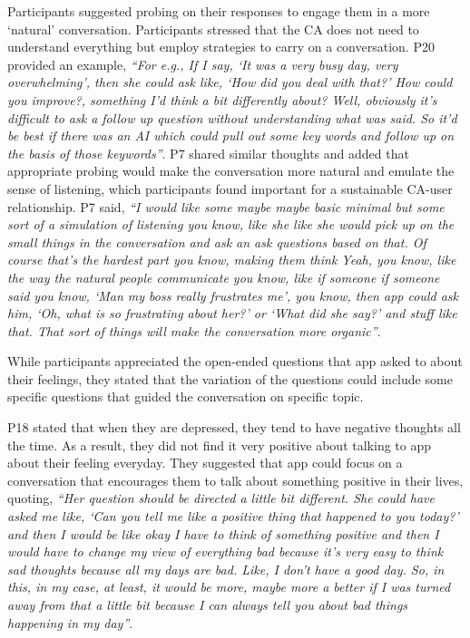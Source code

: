                 Participants suggested probing on their responses to engage them in a more `natural' conversation. Participants stressed that the \ac{CA} does not need to understand everything but employ strategies to carry on a conversation.
                P20 provided an example,
                    \textit{``For e.g., If I say, `It was a very busy day, very overwhelming', then she could ask like, `How did you deal with that?' How could you improve?, something I’d think a bit differently about? Well, obviously it’s difficult to ask a follow up question without understanding what was said. So it’d be best if there was an \ac{AI} which could pull out some key words and follow up on the basis of those keywords''}.
                P7 shared similar thoughts and added that appropriate probing would make the conversation more natural and emulate the sense of listening, which participants found important for a sustainable \ac{CA}-user relationship. P7 said,
                    \textit{``I would like some maybe maybe basic minimal but some sort of a simulation of listening you know, like she like she would pick up on the small things in the conversation and ask an ask questions based on that. Of course that's the hardest part you know, making them think Yeah, you know, like the way the natural people communicate you know, like if someone if someone said you know, `Man my boss really frustrates me', you know, then \acl{app} could ask him, `Oh, what is so frustrating about her?' or `What did she say?' and stuff like that. That sort of things will make the conversation more organic''}.
   
                While participants appreciated the open-ended questions that \acl{app} asked to about their feelings, they stated that the variation of the questions could include some specific questions that guided the conversation on specific topic.

                P18 stated that when they are depressed, they tend to have negative thoughts all the time. 
                As a result, they did not find it very positive about talking to \acl{app} about their feeling everyday. They suggested that \acl{app} could focus on a conversation that encourages them to talk about something positive in their lives, quoting,
                    \textit{``Her question should be directed a little bit different. She could have asked me like, `Can you tell me like a positive thing that happened to you today?' and then I would be like okay I have to think of something positive and then I would have to change my view of everything bad because it's very easy to think sad thoughts because all my days are bad. Like, I don't have a good day. So, in this, in my case, at least, it would be more, maybe more a better if I was turned away from that a little bit because I can always tell you about bad things happening in my day''}.
        
